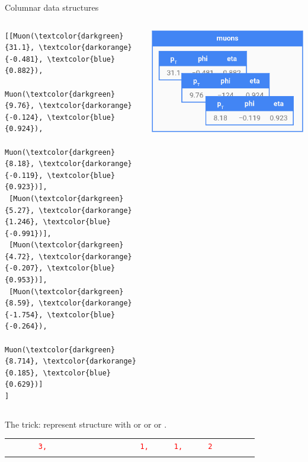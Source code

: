 \documentclass[aspectratio=169]{beamer}
\begin{document}
\begin{frame}[fragile]{Columnar data structures}
\vspace{0.5 cm}
\begin{columns}
\small
\begin{Verbatim}[commandchars=\\\{\}]
[[Muon(\textcolor{darkgreen}{31.1}, \textcolor{darkorange}{-0.481}, \textcolor{blue}{0.882}),
      Muon(\textcolor{darkgreen}{9.76}, \textcolor{darkorange}{-0.124}, \textcolor{blue}{0.924}),
      Muon(\textcolor{darkgreen}{8.18}, \textcolor{darkorange}{-0.119}, \textcolor{blue}{0.923})],
 [Muon(\textcolor{darkgreen}{5.27}, \textcolor{darkorange}{1.246}, \textcolor{blue}{-0.991})],
 [Muon(\textcolor{darkgreen}{4.72}, \textcolor{darkorange}{-0.207}, \textcolor{blue}{0.953})],
 [Muon(\textcolor{darkgreen}{8.59}, \textcolor{darkorange}{-1.754}, \textcolor{blue}{-0.264}),
      Muon(\textcolor{darkgreen}{8.714}, \textcolor{darkorange}{0.185}, \textcolor{blue}{0.629})]
]
\end{Verbatim}
\includegraphics[width=\linewidth]{muons-as-objects.png}
\end{columns}
\vspace{0.5 cm}
\large The trick: represent structure with  or  or  or .
\vspace{0.25 cm}
\begin{tabular}{r l}
\only<1>{\small \textcolor{red}{counts}  & \textcolor{red}{\tt\scriptsize \ \ \ \ \ 3,\ \ \ \ \ \ \ \ \ \ \ \ \ \ \ \ \ \ \ \ \ \ 1,\ \ \ \ \ \ 1,\ \ \ \ \ \ 2\ \ \ \ \ \ \ \ \ } \\}

\end{tabular}
\end{frame}
\end{document}
